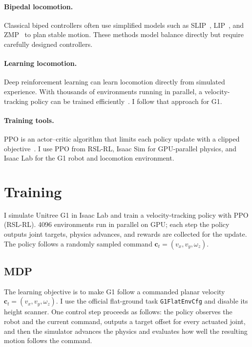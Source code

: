\documentclass[11pt,a4paper]{article}
\begin{document}
\paragraph{Bipedal locomotion.}
Classical biped controllers often use simplified models such as
SLIP~\citep{blickhan1989slip}, LIP~\citep{kajita2001lip}, and
ZMP~\citep{vukobratovic2004zmp} to plan stable motion. These methods model balance
directly but require carefully designed controllers.

\paragraph{Learning locomotion.}
Deep reinforcement learning can learn locomotion directly from simulated
experience. With thousands of environments running in parallel, a
velocity-tracking policy can be trained efficiently~\citep{rudin2022legged}.
I follow that approach for G1.

\paragraph{Training tools.}
PPO is an actor--critic algorithm that limits each policy update with a clipped
objective~\citep{schulman2017ppo}. I use PPO from RSL-RL, Isaac Sim for
GPU-parallel physics, and Isaac Lab for the G1 robot and locomotion
environment.

\section{Training}
\label{sec:train}

I simulate Unitree G1 in Isaac Lab and train a velocity-tracking policy with PPO (RSL-RL).
4096 environments run in parallel on GPU; each step the policy outputs joint targets, physics advances, and rewards are collected for the update.
The policy follows a randomly sampled command $\mathbf{c}_t = (v_x, v_y, \omega_z)$.

\subsection{MDP}

The learning objective is to make G1 follow a commanded planar velocity
$\mathbf{c}_t=(v_x,v_y,\omega_z)$. I use the official flat-ground task
\texttt{G1FlatEnvCfg} and disable its height scanner. One control step proceeds
as follows: the policy observes the robot and the current command, outputs a
target offset for every actuated joint, and then the simulator advances the
physics and evaluates how well the resulting motion follows the command.
\end{document}
